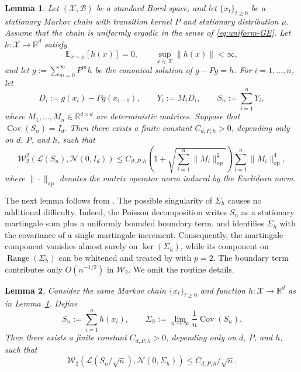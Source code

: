 \documentclass[11pt,letterpaper]{article}
\theoremstyle{plain}
\newtheorem{lemma}{Lemma}
\theoremstyle{definition}
\theoremstyle{remark}
\newcommand{\E}{\mathbb{E}}
\newcommand{\R}{\mathbb{R}}
\newcommand{\W}{\mathcal{W}}
\newcommand{\law}{\mathcal{L}}
\begin{document}
\begin{lemma}\label{lemma:GA-MDS}
Let $(\mathcal X,\mathcal B)$ be a standard Borel space, and let
$\{x_t\}_{t\geq0}$ be a stationary Markov chain with transition kernel
$P$ and stationary distribution $\mu$. Assume that the chain is uniformly
ergodic in the sense of \eqref{eq:uniform-GE}. Let
$h:\mathcal X\to\R^d$ satisfy
\[
    \E_{x \sim \mu}[h(x)]=0,
    \qquad
    \sup_{x \in \mathcal X}\|h(x)\|<\infty,
\]
and let $g:=\sum_{m=0}^{\infty}P^m h$ be the canonical solution of $g-Pg=h$. For $i=1,\ldots,n$, let
\[
    D_i:=g(x_i)-Pg(x_{i-1}),
    \qquad
    Y_i:=M_iD_i,
    \qquad
    S_n:=\sum_{i=1}^nY_i,
\]
where $M_1,\ldots,M_n\in\R^{d\times d}$ are deterministic matrices. Suppose that $\operatorname{Cov}(S_n)=I_d.$ Then there exists a finite constant $C_{d,P,h}>0$, depending only on
$d$, $P$, and $h$, such that
\begin{equation}\label{eq:main-bound}
    \W_2^2\!\left(
        \law(S_n),\mathcal N(0,I_d)
    \right)
    \leq
    C_{d,P,h}
    \left(
        1+
        \sqrt{\sum_{i=1}^n\|M_i\|_{\mathrm{op}}^2}
    \right)
    \sum_{i=1}^n\|M_i\|_{\mathrm{op}}^4,
\end{equation}
where \(\|\cdot\|_{\mathrm{op}}\) denotes the matrix operator norm induced by
the Euclidean norm.
\end{lemma}
The next lemma follows from \cite[Corollary~1 and Section~EC.3]{zhang2026martingale}.
The possible singularity of $\Sigma_h$ causes no additional difficulty.
Indeed, the Poisson decomposition writes $S_n$ as a stationary
martingale sum plus a uniformly bounded boundary term, and identifies
$\Sigma_h$ with the covariance of a single martingale increment.
Consequently, the martingale component vanishes almost surely on
$\ker(\Sigma_h)$, while its component on $\operatorname{Range}(\Sigma_h)$
can be whitened and treated by \cite[Corollary~1]{zhang2026martingale}
with $p=2$. The boundary term contributes only $O(n^{-1/2})$ in
$\W_2$. We omit
the routine details.
\begin{lemma}\label{lem:GA-MC}
Consider the same Markov chain $\{x_t\}_{t\geq0}$ and function
$h:\mathcal X\to\R^d$ as in Lemma~\ref{lemma:GA-MDS}. Define
\[
    S_n:=\sum_{i=1}^n h(x_i),
    \qquad
    \Sigma_h:=
    \lim_{n\to\infty}
    \frac{1}{n}\operatorname{Cov}(S_n).
\]
Then there exists a finite constant $C_{d,P,h}>0$, depending only on
$d$, $P$, and $h$, such that
\[
    \W_2\left(
        \law\left(S_n/\sqrt n\right),
        \mathcal N(0,\Sigma_h)
    \right)
    \leq C_{d,P,h}/\sqrt{n}.
\]
\end{lemma}
\end{document}
